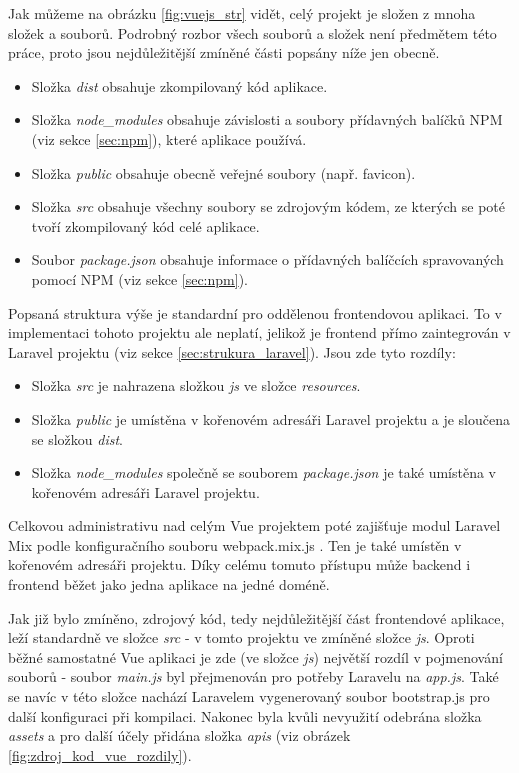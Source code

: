 	Jak můžeme na obrázku \ref{fig:vuejs_str} vidět, celý projekt je složen z mnoha složek a souborů. Podrobný rozbor všech souborů a složek není předmětem této práce, proto jsou nejdůležitější zmíněné části popsány níže jen obecně.
	
	\begin{itemize}
		\item Složka \textit{dist} obsahuje zkompilovaný kód aplikace. \cite{FEDistFolder}
		\item Složka \textit{node\_modules} obsahuje závislosti a soubory přídavných balíčků NPM (viz sekce \ref{sec:npm}), které aplikace používá. \cite{VueJSFolder}
		\item Složka \textit{public} obsahuje obecně veřejné soubory (např. favicon). \cite{VueJSFolder}
		\item Složka \textit{src} obsahuje všechny soubory se zdrojovým kódem, ze kterých se poté tvoří zkompilovaný kód celé aplikace. \cite{VueJSFolder}
		\item Soubor \textit{package.json} obsahuje informace o přídavných balíčcích spravovaných pomocí NPM (viz sekce \ref{sec:npm}). \cite{VueJSFolder}
	\end{itemize}
	
	Popsaná struktura výše je standardní pro oddělenou frontendovou aplikaci. To v implementaci tohoto projektu ale neplatí, jelikož je frontend přímo zaintegrován v Laravel projektu (viz sekce \ref{sec:strukura_laravel}). Jsou zde tyto rozdíly:
	
	\begin{itemize}
		\item Složka \textit{src} je nahrazena složkou \textit{js} ve složce \textit{resources}.
		\item Složka \textit{public} je umístěna v kořenovém adresáři Laravel projektu a je sloučena se složkou \textit{dist}.
		\item Složka \textit{node\_modules} společně se souborem \textit{package.json} je také umístěna v kořenovém adresáři Laravel projektu.
	\end{itemize}
	
	Celkovou administrativu nad celým Vue projektem poté zajišťuje modul Laravel Mix podle konfiguračního souboru webpack.mix.js \cite{LaravelMixVue}. Ten je také umístěn v kořenovém adresáři projektu. Díky celému tomuto přístupu může backend i frontend běžet jako jedna aplikace na jedné doméně.
	
	Jak již bylo zmíněno, zdrojový kód, tedy nejdůležitější část frontendové aplikace, leží standardně ve složce \textit{src} - v tomto projektu ve zmíněné složce \textit{js}. Oproti běžné samostatné Vue aplikaci je zde (ve složce \textit{js}) největší rozdíl v pojmenování souborů - soubor \textit{main.js} byl přejmenován pro potřeby Laravelu na \textit{app.js}. Také se navíc v této složce nachází Laravelem vygenerovaný soubor bootstrap.js pro další konfiguraci při kompilaci. Nakonec byla kvůli nevyužití odebrána složka \textit{assets} a pro další účely přidána složka \textit{apis} (viz obrázek \ref{fig:zdroj_kod_vue_rozdily}).
	
